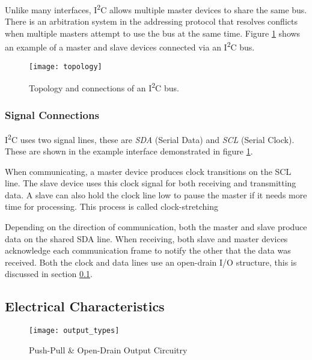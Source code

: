 \documentclass[openany,11pt,fleqn]{book} %
\begin{document}
           Unlike many interfaces, I\textsuperscript{2}C allows multiple master devices to share the same bus. There is an arbitration system in the addressing protocol that resolves conflicts when multiple masters attempt to use the bus at the same time. Figure \ref{topology} shows an example of a master and slave devices connected via an I\textsuperscript{2}C bus. 

            \begin{figure}[]
                \centering\texttt{[image: topology]}
                \caption{Topology and connections of an I\textsuperscript{2}C bus.}
                \label{topology}
            \end{figure}
            
        \subsubsection{Signal Connections}
            I\textsuperscript{2}C uses two signal lines, these are \textit{SDA} (Serial Data) and \textit{SCL} (Serial Clock). These are shown in the example interface demonstrated in figure \ref{topology}. 
            
            When communicating, a master device produces clock transitions on the SCL line. The slave device uses this clock signal for both receiving and transmitting data. A slave can also hold the clock line low to pause the master if it needs more time for processing. This process is called clock-stretching
            
            Depending on the direction of communication, both the master and slave produce data on the shared SDA line. When receiving, both slave and master devices acknowledge each communication frame to notify the other that the data was received.  Both the clock and data lines use an open-drain I/O structure, this is discussed in section \ref{electrical}. 
            
    \subsection{Electrical Characteristics} \label{electrical}
        \begin{figure}[]
            \centering\texttt{[image: output\_types]}
            \caption{Push-Pull \& Open-Drain Output Circuitry}
            \label{output_circuit}
        \end{figure}
        
\end{document}
